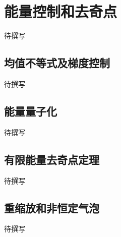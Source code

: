 
% 
% 

\section{能量控制和去奇点}
\label{g4:sec:2305}

待撰写

\subsection{均值不等式及梯度控制}
\label{g4:subsec:2305:01}
待撰写

\subsection{能量量子化}
\label{g4:subsec:2305:02}
待撰写

\subsection{有限能量去奇点定理}
\label{g4:subsec:2305:03}
待撰写

\subsection{重缩放和非恒定气泡}
\label{g4:subsec:2305:04}
待撰写
